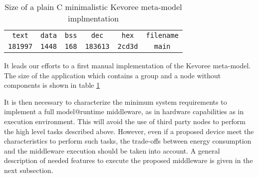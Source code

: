 \begin{table}[htb]
	\centering
	\caption{Size of a plain C minimalistic Kevoree meta-model implmentation}
	\label{tab:kevoreeC}
	\begin{tabular}{cccccc}
		\texttt{text}   & \texttt{data} & \texttt{bss} & \texttt{dec}    & \texttt{hex}   & \texttt{filename} \\
		\texttt{181997} & \texttt{1448} & \texttt{168} & \texttt{183613} & \texttt{2cd3d} & \texttt{main}        
	\end{tabular}
\end{table}

It leads our efforts to a first manual implementation of the Kevoree meta-model.
The size of the application which contains a group and a node without components is shown in table \ref{tab:kevoreeC}






It is then necessary to characterize the minimum system requirements to implement a full model@runtime middleware, as in hardware capabilities as in execution environment.
This will avoid the use of third party nodes to perform the high level tasks described above.
However, even if a proposed device meet the characteristics to perform such tasks, the trade-offs between energy consumption and the middleware execution should be taken into account.
A general description of needed features to execute the proposed middleware is given in the next subsection.

